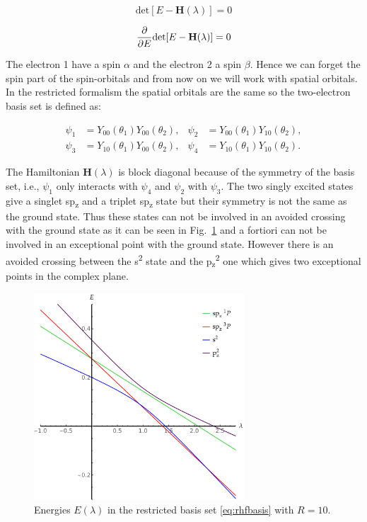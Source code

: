 \documentclass[11pt,a4paper]{article}
\newcommand{\bH}{\mathbf{H}}
\begin{document}
\begin{equation}\label{eq:PolChar}
\text{det}[E-\bH(\lambda)]=0
\end{equation}

\begin{equation}\label{eq:DPolChar}
\pdv{E}\text{det}[E-\bH(\lambda)]=0
\end{equation}

The electron 1 have a spin $\alpha$ and the electron 2 a spin $\beta$. Hence we can forget the spin part of the spin-orbitals and from now on we will work with spatial orbitals. In the restricted formalism the spatial orbitals are the same so the two-electron basis set is defined as:

\begin{align}\label{eq:rhfbasis}
 \psi_1 & =Y_{00}(\theta_1)Y_{00}(\theta_2),
 & 
 \psi_2 & =Y_{00}(\theta_1)Y_{10}(\theta_2),\\
 \psi_3 & =Y_{10}(\theta_1)Y_{00}(\theta_2),
 & 
 \psi_4 & =Y_{10}(\theta_1)Y_{10}(\theta_2).
\end{align}

The Hamiltonian $\bH(\lambda)$ is block diagonal because of the symmetry of the basis set, i.e., $\psi_1$ only interacts with $\psi_4$ and $\psi_2$ with $\psi_3$. The two singly excited states give a singlet sp\textsubscript{z} and a triplet sp\textsubscript{z} state but their symmetry is not the same as the ground state. Thus these states can not be involved in an avoided crossing with the ground state as it can be seen in Fig.~\ref{fig:RHFMiniBas} and a fortiori can not be involved in an exceptional point with the ground state. However there is an avoided crossing between the s\textsuperscript{2} state and the p\textsubscript{z}\textsuperscript{2} one which gives two exceptional points in the complex plane. 

\begin{figure}[h!]
    \centering
    \includegraphics[width=0.7\textwidth]{EMP_RHF_R10.pdf}
    \caption{\centering Energies $E(\lambda)$ in the restricted basis set \eqref{eq:rhfbasis} with $R=10$.}
    \label{fig:RHFMiniBas}
\end{figure}
\end{document}
